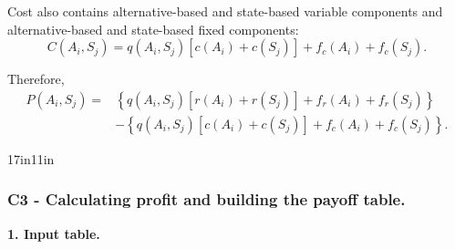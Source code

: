 	Cost also contains alternative-based and state-based variable components and
	alternative-based and state-based fixed components:
	\[
	C(A_i,S_j)
	=
	q(A_i,S_j)
	\left[
	c(A_i)+c(S_j)
	\right]
	+
	f_c(A_i)
	+
	f_c(S_j).
	\]

	Therefore,
	\[
	\begin{aligned}
		P(A_i,S_j)
		={}&
		\left\{
		q(A_i,S_j)
		\left[
		r(A_i)+r(S_j)
		\right]
		+
		f_r(A_i)
		+
		f_r(S_j)
		\right\}
		\\
		&-
		\left\{
		q(A_i,S_j)
		\left[
		c(A_i)+c(S_j)
		\right]
		+
		f_c(A_i)
		+
		f_c(S_j)
		\right\}.
	\end{aligned}
	\]


	\begin{CalculationLandscape}{17in}{11in}
\subsubsection*{C3 - Calculating profit and building the payoff table.}
	\label{subsec:problem21-electric-vehicle-charging-network-c3}

\textbf{1. Input table.}


\end{CalculationLandscape}
